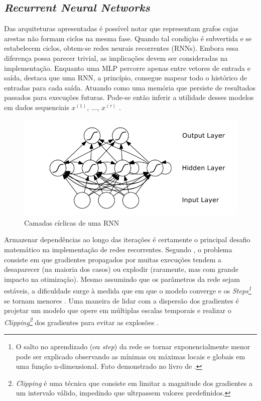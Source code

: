 \subsection{\textit{Recurrent Neural Networks}} \label{sec:rnn}

Das arquiteturas apresentadas é possível notar que representam grafos cujas arestas não formam ciclos na mesma fase.
Quando tal condição é subvertida e se estabelecem ciclos, obtem-se redes neurais recorrentes (RNNs)\cite{graves}.
Embora essa diferença possa parecer trivial, as implicações devem ser consideradas na implementação.
Enquanto uma MLP percorre apenas entre vetores de entrada e saída, \textcite{graves} destaca que uma RNN, a princípio, consegue mapear todo o histórico de entradas para cada saída. Atuando como uma memória que persiste de resultados passados para execuções futuras. 
Pode-se então inferir a utilidade desses modelos em dados sequenciais $x^{(1)}$, ..., $x^{(\tau)}$ \cite{Good}.

\begin{figure}[!htb] \centering
  \caption{Camadas cíclicas de uma RNN} \label{figura:rnn}
  \begin{varwidth}{\linewidth}
    \includegraphics[width=12cm]{figuras/rnn.png}
  \end{varwidth}
\end{figure}

Armazenar dependências ao longo das iterações é certamente o principal desafio matemático na implementação de redes recorrentes.
Segundo \cite{graves}, o problema consiste em que gradientes propagados por muitas execuções tendem a desaparecer (na maioria dos casos) ou explodir (raramente, mas com grande impacto na otimização).
Mesmo assumindo que os parâmetros da rede sejam estáveis, a dificuldade surge à medida que em que o modelo converge e os 
\textit{Steps\footnote{ O salto no aprendizado (ou \textit{step}) da rede se tornar exponencialmente menor pode ser explicado observando as mínimas ou máximas locais e globais em uma função n-dimensional. Fato demonstrado no livro de \textcite{stewart}.}} se tornam menores \cite{Good}.
Uma maneira de lidar com a dispersão dos gradientes é projetar um modelo que opere em múltiplas escalas temporais \cite{Bengio} e realizar o 
\textit{Clipping\footnote{\textit{Clipping} é uma técnica que consiste em limitar a magnitude dos gradientes a um intervalo válido, impedindo que ultrpassem valores predefinidos.}} dos gradientes para evitar as explosões \cite{Exp}.

